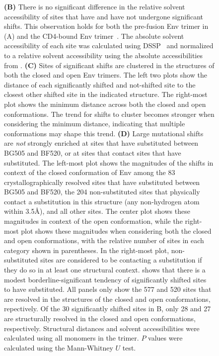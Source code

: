 \documentclass[9pt]{elife}
\newcommand{\angstrom}{\textup{\AA}}
\begin{document}
\begin{figure}
{{\bf (B)} 
There is no significant difference in the relative solvent accessibility of sites that have and have not undergone significant shifts.
This observation holds for both the pre-fusion Env trimer in (A) and the CD4-bound Env trimer~\citep[PDB 5VN3;][]{ozorowski2017open}.
The absolute solvent accessibility of each site was calculated using DSSP~\citep{kabsch1983dictionary} and normalized to a relative solvent accessibility using the absolute accessibilities from \citet{tien2013maximum}.
{\bf (C)} 
Sites of significant shifts are clustered in the structures of both the closed and open Env trimers.
The left two plots show the distance of each significantly shifted and not-shifted site to the closest other shifted site in the indicated structure.
The right-most plot shows the minimum distance across both the closed and open conformations.
The trend for shifts to cluster becomes stronger when considering the minimum distance, indicating that multiple conformations may shape this trend.
{\bf (D)}
Large mutational shifts are \emph{not} strongly enriched at sites that have substituted between BG505 and BF520, or at sites that contact sites that have substituted. 
The left-most plot shows the magnitudes of the shifts in context of the closed conformation of Env among the 83 crystallographically resolved sites that have substituted between BG505 and BF520, the 204 non-substituted sites that physically contact a substitution in this structure (any non-hydrogen atom within 3.5\angstrom), and all other sites.
The center plot shows these magnitudes in context of the open conformation, while the right-most plot shows these magnitudes when considering both the closed and open conformations, with the relative number of sites in each category shown in parentheses.
In the right-most plot, non-substituted sites are considered to be contacting a substitution if they do so in at least one structural context.
 shows that there is a modest borderline-significant tendency of significantly shifted sites to have substituted.
All panels only show the 577 and 520 sites that are resolved in the structures of the closed and open conformations, repectively.
Of the 30 significantly shifted sites in B, only 28 and 27 are structurally resolved in the closed and open conformations, respectively.
Structural distances and solvent accessibilities were calculated using all monomers in the trimer.
$P$ values were calculated using the Mann-Whitney $U$ test.
}
{}


\end{figure}
\end{document}

